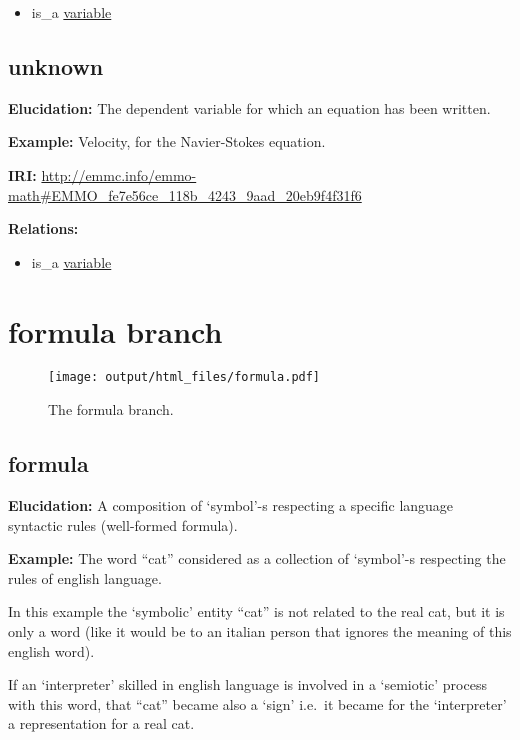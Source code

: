 \documentclass[a4paper,]{report}
\providecommand{\tightlist}{%
  \setlength{\itemsep}{0pt}\setlength{\parskip}{0pt}}
\begin{document}
\begin{itemize}
\tightlist
\item
  is\_a \protect\hyperlink{variable}{variable}
\end{itemize}

\hypertarget{unknown}{%
\subsection{unknown}\label{unknown}}

\textbf{Elucidation:} The dependent variable for which an equation has
been written.

\textbf{Example:} Velocity, for the Navier-Stokes equation.

\textbf{IRI:}
\url{http://emmc.info/emmo-math\#EMMO_fe7e56ce_118b_4243_9aad_20eb9f4f31f6}

\textbf{Relations:}

\begin{itemize}
\tightlist
\item
  is\_a \protect\hyperlink{variable}{variable}
\end{itemize}

\hypertarget{formula-branch}{%
\section{formula branch}\label{formula-branch}}

\begin{figure}
\centering
\texttt{[image: output/html\_files/formula.pdf]}
\caption{The formula branch.}
\end{figure}

\hypertarget{formula}{%
\subsection{formula}\label{formula}}

\textbf{Elucidation:} A composition of `symbol'-s respecting a specific
language syntactic rules (well-formed formula).

\textbf{Example:} The word ``cat'' considered as a collection of
`symbol'-s respecting the rules of english language.

In this example the `symbolic' entity ``cat'' is not related to the real
cat, but it is only a word (like it would be to an italian person that
ignores the meaning of this english word).

If an `interpreter' skilled in english language is involved in a
`semiotic' process with this word, that ``cat'' became also a `sign'
i.e.~it became for the `interpreter' a representation for a real cat.
\end{document}
